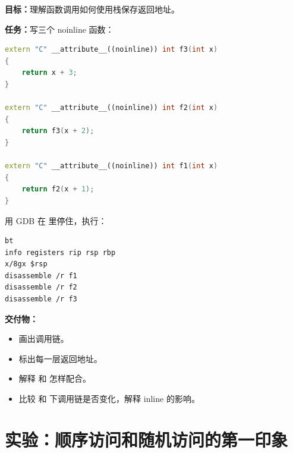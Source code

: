 \begin{labbox}
\textbf{目标：}理解函数调用如何使用栈保存返回地址。

\textbf{任务：}写三个 noinline 函数：

\begin{lstlisting}[language=C++]
extern "C" __attribute__((noinline)) int f3(int x)
{
    return x + 3;
}

extern "C" __attribute__((noinline)) int f2(int x)
{
    return f3(x + 2);
}

extern "C" __attribute__((noinline)) int f1(int x)
{
    return f2(x + 1);
}
\end{lstlisting}

用 GDB 在  里停住，执行：

\begin{lstlisting}
bt
info registers rip rsp rbp
x/8gx $rsp
disassemble /r f1
disassemble /r f2
disassemble /r f3
\end{lstlisting}

\textbf{交付物：}

\begin{itemize}
  \item 画出调用链。
  \item 标出每一层返回地址。
  \item 解释  和  怎样配合。
  \item 比较  和  下调用链是否变化，解释 inline 的影响。
\end{itemize}
\end{labbox}

\section{实验：顺序访问和随机访问的第一印象}

